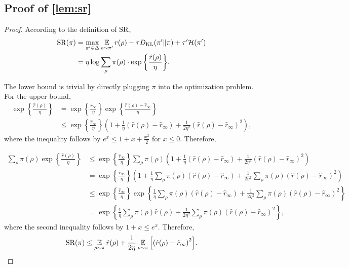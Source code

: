 \subsection{Proof of \cref{lem:sr}}
\begin{proof}
According to the definition of $\text{SR}$,
\begin{align*}
	\text{SR}(\pi) &= \max_{\pi^\prime \in \Delta}{  \operatorname*{\mathbb{E}}\limits_{\rho \sim \pi^\prime }{ r(\rho) } - \tau D_{\mathrm{KL}}(\pi' \Vert \pi) + \tau' \mathcal{H}(\pi') } \\
	&= \eta \log \sum\limits_{\rho}{ \pi(\rho) \cdot \exp \left\{ \frac{\hat{r}(\rho)}{\eta}\right\} }.
\end{align*}

The lower bound is trivial by directly plugging $\pi$ into the optimization problem. For the upper bound,
\begin{align*}
	\exp \left\{ \frac{\hat{r}(\rho)}{\eta} \right\} &= \exp \left\{ \frac{\hat{r}_\infty}{\eta} \right\} \exp\left\{ \frac{\hat{r}(\rho) - \hat{r}_\infty }{\eta}\right\} \\
	&\leq \exp \left\{ \frac{\hat{r}_\infty}{\eta} \right\} \left( 1 + \frac{1}{\eta} \left( \hat{r}(\rho) - \hat{r}_\infty \right) + \frac{1}{2\eta^2} \left(\hat{r}(\rho) - \hat{r}_\infty \right)^2\right),
\end{align*}
where the inequality follows by $e^x \leq 1+x+ \frac{x^2}{2}$ for $x\leq 0$. Therefore,

\begin{align*}
	\sum\limits_{\rho} \pi(\rho) \exp\left\{ \frac{\hat{r}(\rho)}{\eta}\right\} &\leq \exp\left\{\frac{\hat{r}_\infty}{\eta}\right\}  \sum_\rho \pi(\rho) \left( 1 + \frac{1}{\eta} \left( \hat{r}(\rho) - \hat{r}_\infty \right) + \frac{1}{2\eta^2} \left(\hat{r}(\rho) - \hat{r}_\infty \right)^2\right) \\
	&=  \exp\left\{ \frac{\hat{r}_\infty}{\eta}\right\} \left( 1 + \frac{1}{\eta} \sum\limits_{\rho} \pi(\rho){ \left( \hat{r}(\rho) -\hat{r}_\infty \right) } + \frac{1}{2\eta^2} \sum\limits_{\rho} \pi(\rho) \left(  \hat{r}(\rho) - \hat{r}_\infty \right)^2 \right) \\
	&\leq \exp\left\{ \frac{\hat{r}_\infty}{\eta}\right\} \exp \left\{ \frac{1}{\eta} \sum\limits_{\rho} \pi(\rho) \left( \hat{r}(\rho)-\hat{r}_\infty \right) + \frac{1}{2\eta^2} \sum\limits_{\rho} \pi(\rho) \left(  \hat{r}(\rho) - \hat{r}_\infty \right)^2 \right\} \\
	&= \exp \left\{ \frac{1}{\eta} \sum\limits_{\rho} \pi(\rho) \hat{r}(\rho) + \frac{1}{2\eta^2} \sum\limits_{\rho} \pi(\rho) \left( \hat{r}(\rho) - \hat{r}_\infty \right)^2 \right\},
\end{align*}
where the second inequality follows by $1+x \leq e^x$. Therefore,
\begin{align*}
\text{SR}(\pi) \leq \operatorname*{\mathbb{E}}\limits_{\rho \sim \pi}{\hat{r}(\rho)} + \frac{1}{2\eta} \operatorname*{\mathbb{E}}_{\rho\sim \pi}{\left[\left( \hat{r}(\rho) - \hat{r}_\infty \right)^2 \right]}.
\end{align*}


\end{proof}
